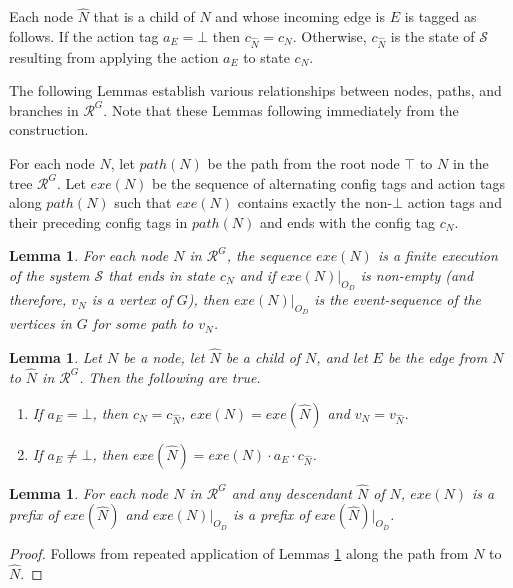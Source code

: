 \documentclass[11pt]{article}
\numberwithin{theorem}{section}
\newtheorem{lemma}[theorem]{Lemma}
\begin{document}
Each node $\hat{N}$ that is a child of $N$ and whose incoming edge is
$E$ is tagged as follows. 
If the action tag $a_E = \bot$ then $c_{\hat{N}} = c_N$. 
Otherwise, $c_{\hat{N}}$ is the state of $\mathcal{S}$ resulting from applying the
action $a_E$ to state $c_N$. 








The following Lemmas establish various relationships between nodes,
paths, and branches in
$\mathcal{R}^G$. Note that these Lemmas following immediately
from the construction.



 For each node $N$, let $path(N)$ be the path from the root node $\top$
 to $N$ in the tree $\mathcal{R}^{G}$. 
Let $exe(N)$ be the sequence of alternating config tags and action
tags along $path(N)$ such that $exe(N)$ contains exactly the
non-$\bot$ action tags and their preceding config tags in $path(N)$ and
ends with the config tag $c_N$. 



\begin{lemma}\label{prop:nodeFiniteExe}
 For each node $N$ in $\mathcal{R}^{G}$, the sequence $exe(N)$ is a finite execution of the system $\mathcal{S}$ that ends in state $c_N$ and if $exe(N)|_{O_D}$ is non-empty (and therefore, $v_N$ is a vertex of $G$), then $exe(N)|_{O_D}$ is the event-sequence of the vertices in $G$ for some path to $v_N$.
\end{lemma}

\begin{lemma}\label{prop:botChild}\label{prop:nonBotChild}
Let $N$ be a node, let $\hat{N}$ be a child of $N$, and let $E$ be the edge from $N$ to $\hat{N}$ in $\mathcal{R}^G$. Then the following are true.
 \begin{enumerate}
 \item If $a_E = \bot$, then $c_N = c_{\hat{N}}$, $exe(N) = exe(\hat{N})$ and $v_N = v_{\hat{N}}$.
 \item If $a_E \neq \bot$, then $exe(\hat{N}) = exe(N) \cdot a_E \cdot c_{\hat{N}}$.
 \end{enumerate}
\end{lemma}

\begin{lemma}\label{prop:ancesterPrefix}\label{prop:ancesterPrefixAFDEvents}
 For each node $N$ in $\mathcal{R}^{G}$ and any descendant $\hat{N}$ of $N$, $exe(N)$ is a prefix of $exe(\hat{N})$ and $exe(N)|_{O_D}$ is a prefix of $exe(\hat{N})|_{O_D}$.
\end{lemma}
\begin{proof}
 Follows from repeated application of Lemmas \ref{prop:botChild} along the path from $N$ to $\hat{N}$.
\end{proof}
\end{document}
